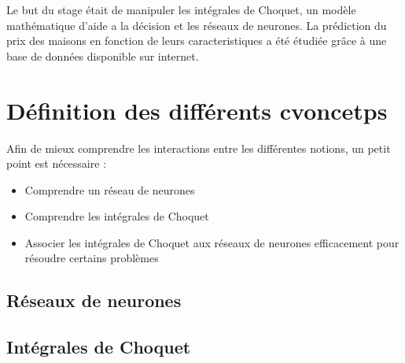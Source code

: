 
Le but du stage était de manipuler les intégrales de Choquet,
un modèle mathématique d'aide a la décision et les réseaux de neurones.
La prédiction du prix des maisons en fonction de leurs caracteristiques a été étudiée
grâce à une base de données disponible sur internet\cite{houses}.


\section{Définition des différents cvoncetps}
\label{sec:th}
Afin de mieux comprendre les interactions entre les différentes notions,
un petit point est nécessaire :
\begin{itemize}
    \item Comprendre un réseau de neurones
    \item Comprendre les intégrales de Choquet
    \item Associer les intégrales de Choquet aux réseaux de neurones efficacement pour résoudre certains problèmes
\end{itemize}

\subsection{Réseaux de neurones}\label{subsec:réseau-de-neurones}


\newpage


\subsection{Intégrales de Choquet}\label{subsec:intégrales-de-Choquet}

